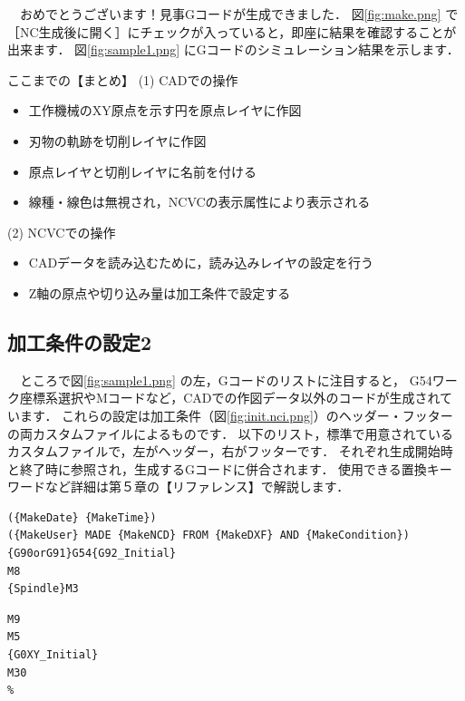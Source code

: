 　おめでとうございます！見事Gコードが生成できました．
図\ref{fig:make.png} で［NC生成後に開く］にチェックが入っていると，即座に結果を確認することが出来ます．
図\ref{fig:sample1.png} にGコードのシミュレーション結果を示します．

\vspace*{3zh}
\begin{itembox}[l]{ここまでの【まとめ】}
(1) CADでの操作
\begin{itemize}
\item 工作機械のXY原点を示す円を原点レイヤに作図
\item 刃物の軌跡を切削レイヤに作図
\item 原点レイヤと切削レイヤに名前を付ける
\item 線種・線色は無視され，NCVCの表示属性により表示される
\end{itemize}
(2) NCVCでの操作
\begin{itemize}
\item CADデータを読み込むために，読み込みレイヤの設定を行う
\item Z軸の原点や切り込み量は加工条件で設定する
\end{itemize}
\end{itembox}

\newpage
\subsection{加工条件の設定2}

　ところで図\ref{fig:sample1.png} の左，Gコードのリストに注目すると，
G54ワーク座標系選択やMコードなど，CADでの作図データ以外のコードが生成されています．
これらの設定は加工条件（図\ref{fig:init.nci.png}）のヘッダー・フッターの両カスタムファイルによるものです．
以下のリスト，標準で用意されているカスタムファイルで，左がヘッダー，右がフッターです．
それぞれ生成開始時と終了時に参照され，生成するGコードに併合されます．
使用できる置換キーワードなど詳細は第５章の【リファレンス】で解説します．

\begin{minipage}[t]{0.75\textwidth}
\begin{lstlisting}[caption=Header.txt,numbers=none,label=lst:header.txt]
%
({MakeDate} {MakeTime})
({MakeUser} MADE {MakeNCD} FROM {MakeDXF} AND {MakeCondition})
{G90orG91}G54{G92_Initial}
M8
{Spindle}M3
\end{lstlisting}
\end{minipage}
\begin{minipage}[t]{0.25\textwidth}
\begin{lstlisting}[caption=Footer.txt,numbers=none,label=lst:footer.txt]
M9
M5
{G0XY_Initial}
M30
%
\end{lstlisting}
\end{minipage}

